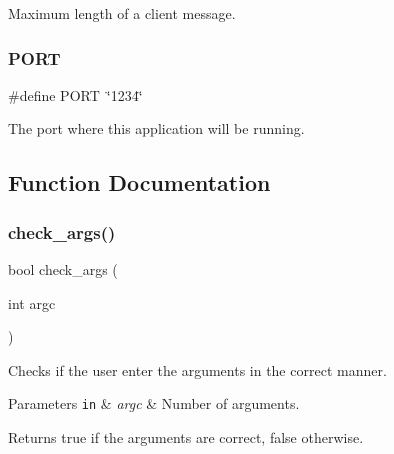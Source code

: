 Maximum length of a client message. 

\mbox{\label{zip-zop-client_8c_a614217d263be1fb1a5f76e2ff7be19a2}} 
\subsubsection{\texorpdfstring{P\+O\+RT}{PORT}}
{\footnotesize\ttfamily \#define P\+O\+RT~\char`\"{}1234\char`\"{}}



The port where this application will be running. 



\subsection{Function Documentation}
\mbox{\label{zip-zop-client_8c_ae42aaff0193542f01451e25d0d0e6725}} 
\subsubsection{\texorpdfstring{check\+\_\+args()}{check\_args()}}
{\footnotesize\ttfamily bool check\+\_\+args (\begin{DoxyParamCaption}\item[{int}]{argc }\end{DoxyParamCaption})}



Checks if the user enter the arguments in the correct manner. 


\begin{DoxyParams}[1]{Parameters}
\mbox{\tt in}  & {\em argc} & Number of arguments.\\
\hline
\end{DoxyParams}
\begin{DoxyReturn}{Returns}
{\ttfamily true} if the arguments are correct, {\ttfamily false} otherwise. 
\end{DoxyReturn}
\mbox{\label{zip-zop-client_8c_a1c3a34b362da4351d526c8af94b228c6}} 
